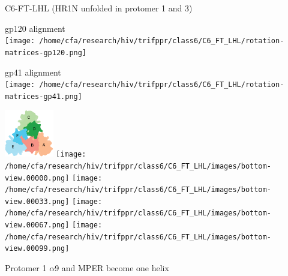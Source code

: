\begin{frame}[fragile]{C6-FT-LHL (HR1N unfolded in protomer 1 and 3)}
    \begin{center}
        \begin{minipage}{0.47\textwidth}
            \begin{center}
                gp120 alignment\\
                \texttt{[image: /home/cfa/research/hiv/trifppr/class6/C6\_FT\_LHL/rotation-matrices-gp120.png]}
            \end{center}
        \end{minipage}
        \begin{minipage}{0.47\textwidth}
            \begin{center}
                gp41 alignment\\
                \texttt{[image: /home/cfa/research/hiv/trifppr/class6/C6\_FT\_LHL/rotation-matrices-gp41.png]}
            \end{center}
        \end{minipage}

        \includegraphics[width=0.16\textwidth]{trimer_paint_bottom_sodroski_smol.png}
        \texttt{[image: /home/cfa/research/hiv/trifppr/class6/C6\_FT\_LHL/images/bottom-view.00000.png]}
        \texttt{[image: /home/cfa/research/hiv/trifppr/class6/C6\_FT\_LHL/images/bottom-view.00033.png]}
        \texttt{[image: /home/cfa/research/hiv/trifppr/class6/C6\_FT\_LHL/images/bottom-view.00067.png]}
        \texttt{[image: /home/cfa/research/hiv/trifppr/class6/C6\_FT\_LHL/images/bottom-view.00099.png]}

        Protomer 1 $\alpha$9 and MPER become one helix 
    \end{center}
\end{frame}

